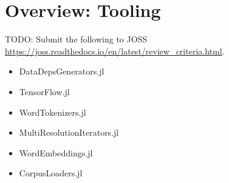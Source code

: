 \documentclass{book}
\begin{document}
	
	\chapter{Overview: Tooling}
	TODO: Submit the following to JOSS	\url{https://joss.readthedocs.io/en/latest/review_criteria.html}.
	
	\begin{itemize}
		\item DataDepsGenerators.jl
		\item TensorFlow.jl
		\item WordTokenizers.jl
		\item MultiResolutionIterators.jl
		\item WordEmbeddings.jl
		\item CorpusLoaders.jl
	\end{itemize}
	
	
	
\end{document}
